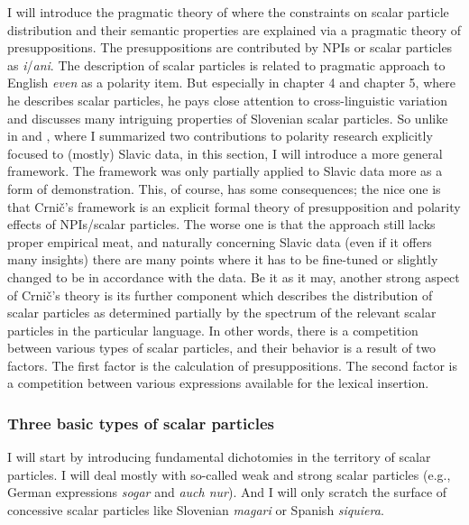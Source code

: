 \documentclass[output=paper,colorlinks,citecolor=brown]{langscibook}
\begin{document}
I will introduce the pragmatic theory of \citet{Crnic2011} where the constraints on scalar particle distribution and their semantic properties are explained via a pragmatic theory of presuppositions. The presuppositions are contributed by NPIs or scalar particles as \emph{i}/\emph{ani}. The description of scalar particles is related to  pragmatic approach to English \emph{even} as a polarity item. But especially in chapter 4 and chapter 5, where he describes scalar particles, he pays close attention to cross-linguistic variation and discusses many intriguing properties of Slovenian scalar particles. So unlike in  and , where I summarized two contributions to polarity research explicitly focused to (mostly) Slavic data, in this section, I will introduce a more general framework. The framework was only partially applied to Slavic data more as a form of demonstration. This, of course, has some consequences; the nice one is that Crnič's framework is an explicit formal theory of presupposition and polarity effects of NPIs/scalar particles. The worse one is that the approach still lacks proper empirical meat, and naturally concerning Slavic data (even if it offers many insights) there are many points where it has to be fine-tuned or slightly changed to be in accordance with the data. Be it as it may, another strong aspect of Crnič's theory is its further component which describes the distribution of scalar particles as determined partially by the spectrum of the relevant scalar particles in the particular language. In other words, there is a competition between various types of scalar particles, and their behavior is a result of two factors. The first factor is the calculation of presuppositions. The second factor is a competition between various expressions available for the lexical insertion.

\subsubsection{Three basic types of scalar particles}\label{three-basic-types-of-scalar-particles}

I will start by introducing fundamental dichotomies in the territory of scalar particles. I will deal mostly with so-called weak and strong scalar particles (e.g., German expressions \emph{sogar} and \emph{auch nur}). And I will only scratch the surface of concessive scalar particles like Slovenian \emph{magari} or Spanish \emph{siquiera}.
\end{document}
